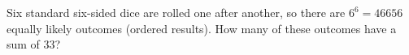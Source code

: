 Six standard six-sided dice are rolled one after another, so there are $6^6=46656$ equally likely outcomes (ordered results). How many of these outcomes have a sum of $33$?
